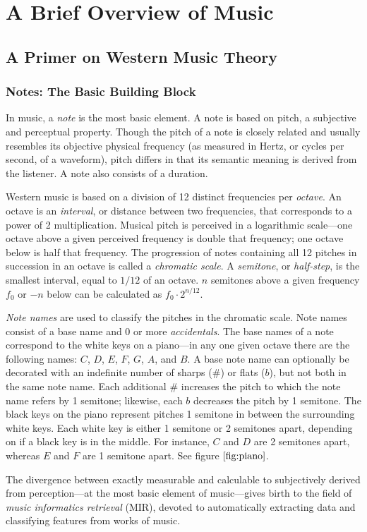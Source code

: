 \chapter{A Brief Overview of Music}

\section{A Primer on Western Music Theory}

\subsection{Notes: The Basic Building Block}

In music, a \textit{note} is the most basic element. A note is based on pitch, a subjective and perceptual property. Though the pitch of a note is closely related and usually resembles its objective physical frequency (as measured in Hertz, or cycles per second, of a waveform), pitch differs in that its semantic meaning is derived from the listener. A note also consists of a duration.

Western music is based on a division of 12 distinct frequencies per \textit{octave}. An octave is an \textit{interval}, or distance between two frequencies, that corresponds to a power of 2 multiplication. Musical pitch is perceived in a logarithmic scale---one octave above a given perceived frequency is double that frequency; one octave below is half that frequency. The progression of notes containing all 12 pitches in succession in an octave is called a \textit{chromatic scale}. A \textit{semitone}, or \textit{half-step}, is the smallest interval, equal to $1/12$ of an octave. $n$ semitones above a given frequency $f_0$ or $-n$ below can be calculated as $f_0 \cdot 2^{n/12}$.

\textit{Note names} are used to classify the pitches in the chromatic scale. Note names consist of a base name and 0 or more \textit{accidentals}. The base names of a note correspond to the white keys on a piano---in any one given octave there are the following names: $C$, $D$, $E$, $F$, $G$, $A$, and $B$. A base note name can optionally be decorated with an indefinite number of sharps ($\#$) or flats ($b$), but not both in the same note name. Each additional $\#$ increases the pitch to which the note name refers by 1 semitone; likewise, each $b$ decreases the pitch by 1 semitone. The black keys on the piano represent pitches 1 semitone in between the surrounding white keys. Each white key is either 1 semitone or 2 semitones apart, depending on if a black key is in the middle. For instance, $C$ and $D$ are 2 semitones apart, whereas $E$ and $F$ are 1 semitone apart. See figure $\ref{fig:piano}$.

The divergence between exactly measurable and calculable to subjectively derived from perception---at the most basic element of music---gives birth to the field of \textit{music informatics retrieval} (MIR), devoted to automatically extracting data and classifying features from works of music.